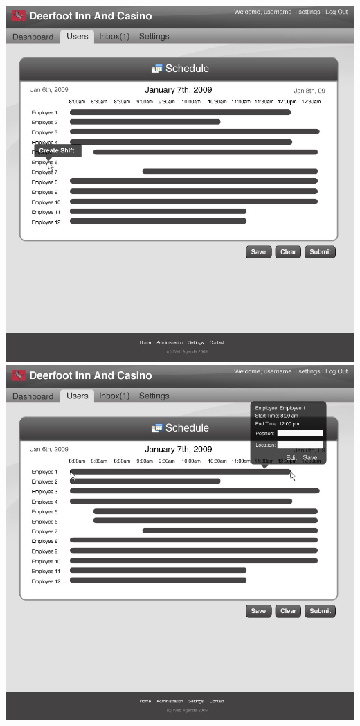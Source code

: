 \documentclass[letterpaper,12pt]{report}
\begin{document}
\begin{landscape}
\section{}
\begin{center}
 \includegraphics[scale=0.3]{prototypes/createScheduleClickEmp.jpg}
 \includegraphics[scale=0.3]{prototypes/createSchedDrag.jpg}
\end{center}



\end{landscape}
\end{document}
